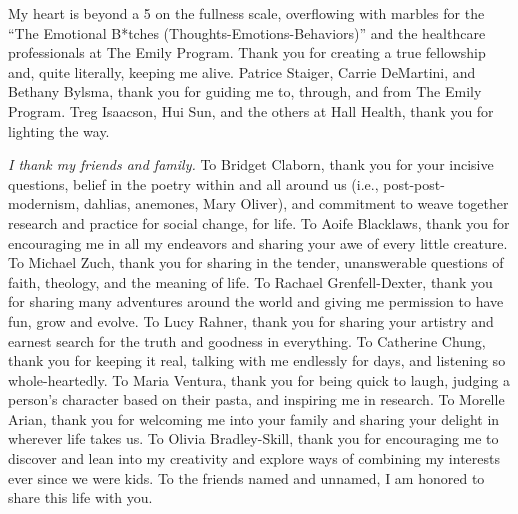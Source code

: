 My heart is beyond a 5 on the fullness scale, overflowing with marbles for the
``The Emotional B*tches (Thoughts-Emotions-Behaviors)'' and the healthcare
professionals at The Emily Program. 
Thank you for creating a true fellowship and, quite literally, keeping me alive.
Patrice Staiger, Carrie DeMartini, and Bethany Bylsma, thank you for guiding me
to, through, and from The Emily Program. Treg Isaacson, Hui Sun, and the others 
at Hall Health, thank you for lighting the way.

\textit{I thank my friends and family.} To Bridget Claborn, thank you for your
incisive questions, belief in the poetry within and all around us (i.e.,
post-post-modernism, dahlias, anemones, Mary Oliver), and commitment to weave
together research and practice for social change, for life.
To Aoife Blacklaws, thank you for encouraging me in all my endeavors and sharing
your awe of every little creature. To Michael Zuch, thank you for sharing in the
tender, unanswerable questions of faith, theology, and the meaning of life. To Rachael
Grenfell-Dexter, thank you for sharing many adventures around the world and giving me permission to have fun, grow and evolve. To Lucy
Rahner, thank you for sharing your artistry and earnest search for the truth and
goodness in everything. To Catherine Chung, thank you for keeping it real,
talking with me endlessly for days, and listening so whole-heartedly. 
To Maria Ventura, thank you for being quick to laugh, judging a person's character based on their pasta, and inspiring me in research.
To Morelle Arian, thank you for welcoming me into your family and sharing your delight in wherever life takes us. 
To Olivia Bradley-Skill, thank you for encouraging me to discover and lean into my creativity and explore ways of combining my interests ever since we were kids.
To the friends named and unnamed, I am honored to share this life with you. 


